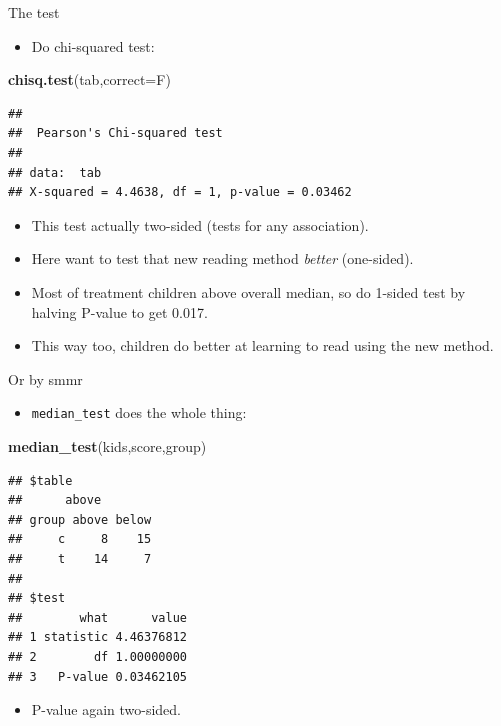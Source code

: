 \documentclass[ignorenonframetext,]{beamer}
\newenvironment{Shaded}{\begin{snugshade}}{\end{snugshade}}
\newcommand{\DataTypeTok}[1]{\textcolor[rgb]{0.13,0.29,0.53}{#1}}
\newcommand{\KeywordTok}[1]{\textcolor[rgb]{0.13,0.29,0.53}{\textbf{#1}}}
\newcommand{\NormalTok}[1]{#1}
\providecommand{\tightlist}{%
  \setlength{\itemsep}{0pt}\setlength{\parskip}{0pt}}
\begin{document}
\begin{frame}[fragile]{The test}
\protect\hypertarget{the-test}{}

\begin{itemize}
\tightlist
\item
  Do chi-squared test:
\end{itemize}

\begin{Shaded}
\begin{Highlighting}[]
\KeywordTok{chisq.test}\NormalTok{(tab,}\DataTypeTok{correct=}\NormalTok{F)}
\end{Highlighting}
\end{Shaded}

\begin{verbatim}
## 
##  Pearson's Chi-squared test
## 
## data:  tab
## X-squared = 4.4638, df = 1, p-value = 0.03462
\end{verbatim}

\begin{itemize}
\tightlist
\item
  This test actually two-sided (tests for any association).
\item
  Here want to test that new reading method \emph{better} (one-sided).
\item
  Most of treatment children above overall median, so do 1-sided test by
  halving P-value to get 0.017.
\item
  This way too, children do better at learning to read using the new
  method.
\end{itemize}

\end{frame}

\begin{frame}[fragile]{Or by smmr}
\protect\hypertarget{or-by-smmr}{}

\begin{itemize}
\tightlist
\item
  \texttt{median\_test} does the whole thing:
\end{itemize}

\begin{Shaded}
\begin{Highlighting}[]
\KeywordTok{median_test}\NormalTok{(kids,score,group)}
\end{Highlighting}
\end{Shaded}

\begin{verbatim}
## $table
##      above
## group above below
##     c     8    15
##     t    14     7
## 
## $test
##        what      value
## 1 statistic 4.46376812
## 2        df 1.00000000
## 3   P-value 0.03462105
\end{verbatim}

\begin{itemize}
\tightlist
\item
  P-value again two-sided.
\end{itemize}

\end{frame}
\end{document}
